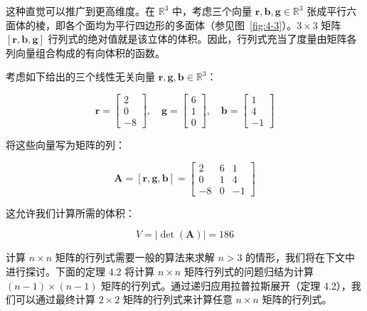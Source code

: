 \begin{notebox}
这种直觉可以推广到更高维度。在 $ \mathbb{R}^3 $ 中，考虑三个向量 $ \boldsymbol{r}, \boldsymbol{b}, \boldsymbol{g} \in \mathbb{R}^3 $ 张成平行六面体的棱，即各个面均为平行四边形的多面体（参见图~\ref{fig:4-3}）。$ 3 \times 3 $ 矩阵 $ [\boldsymbol{r}, \boldsymbol{b}, \boldsymbol{g}] $ 行列式的绝对值就是该立体的体积。因此，行列式充当了度量由矩阵各列向量组合构成的有向体积的函数。
\end{notebox}

\begin{notebox}
考虑如下给出的三个线性无关向量 $ \boldsymbol{r}, \boldsymbol{g}, \boldsymbol{b} \in \mathbb{R}^3 $：

\begin{equation}
\boldsymbol{r} = \begin{bmatrix} 2 \\ 0 \\ -8 \end{bmatrix}, \quad \boldsymbol{g} = \begin{bmatrix} 6 \\ 1 \\ 0 \end{bmatrix}, \quad \boldsymbol{b} = \begin{bmatrix} 1 \\ 4 \\ -1 \end{bmatrix}
\tag{4.9}\label{eq:4-9}
\end{equation}

将这些向量写为矩阵的列：

\begin{equation}
\boldsymbol{A} = [\boldsymbol{r}, \boldsymbol{g}, \boldsymbol{b}] = \begin{bmatrix} 2 & 6 & 1 \\ 0 & 1 & 4 \\ -8 & 0 & -1 \end{bmatrix}
\tag{4.10}\label{eq:4-10}
\end{equation}

这允许我们计算所需的体积：

\begin{equation}
V = |\det(\boldsymbol{A})| = 186
\tag{4.11}\label{eq:4-11}
\end{equation}
\end{notebox}

计算 $ n \times n $ 矩阵的行列式需要一般的算法来求解 $ n > 3 $ 的情形，我们将在下文中进行探讨。下面的定理 4.2 将计算 $ n \times n $ 矩阵行列式的问题归结为计算 $ (n - 1) \times (n - 1) $ 矩阵的行列式。通过递归应用拉普拉斯展开（定理 4.2），我们可以通过最终计算 $ 2 \times 2 $ 矩阵的行列式来计算任意 $ n \times n $ 矩阵的行列式。

